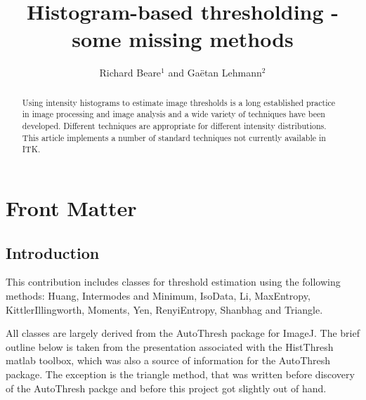 \documentclass{InsightArticle}
\title{Histogram-based thresholding - some missing methods}
\author{Richard Beare{$^1$} {\small{and}} Ga\"etan Lehmann{$^2$}}
\newcommand{\IJhandlerIDnumber}{}
\begin{document}
%
% 
\IJhandlefooter{\IJhandlerIDnumber}{3279}

\maketitle

\ifhtml
\chapter*{Front Matter\label{front}}
\fi


\begin{abstract}
\noindent
Using intensity histograms to estimate image thresholds is a long
established practice in image processing and image analysis and a wide
variety of techniques have been developed. Different techniques are
appropriate for different intensity distributions. This article
implements a number of standard techniques not currently available in
ITK.
\end{abstract}

\IJhandlenote{\IJhandlerIDnumber}

\tableofcontents

\section{Introduction}
This contribution includes classes for threshold estimation using the
following methods: Huang\cite{huang1995image},
Intermodes and Minimum\cite{prewitt1965analysis}, IsoData\cite{ridler1978picture},
Li\cite{li1993minimum,li1998iterative}, MaxEntropy\cite{kapur1985new},
KittlerIllingworth\cite{kittler1986minimum},
Moments\cite{tsai1985moment}, Yen\cite{yen1995new},
RenyiEntropy\cite{kapur1985new},
Shanbhag\cite{shanbhag1994utilization} and
Triangle\cite{zack1977automatic}.

All classes are largely derived from the AutoThresh
\cite{LandiniImageJ} package for ImageJ. The brief outline below is
taken from the presentation associated with the
HistThresh\cite{HistThreshMatlab} matlab toolbox, which was also a
source of information for the AutoThresh package. The exception is the
triangle method, that was written before discovery of the AutoThresh
packge and before this project got slightly out of hand.
\end{document}

